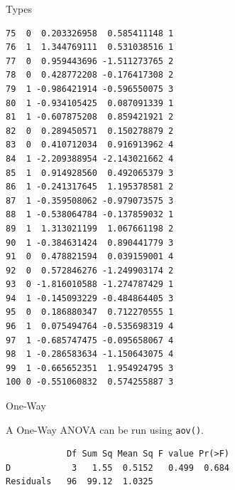 \begin{frame}[fragile]{Types}
\begin{verbatim}
75  0  0.203326958  0.585411148 1
76  1  1.344769111  0.531038516 1
77  0  0.959443696 -1.511273765 2
78  0  0.428772208 -0.176417308 2
79  1 -0.986421914 -0.596550075 3
80  1 -0.934105425  0.087091339 1
81  1 -0.607875208  0.859421921 2
82  0  0.289450571  0.150278879 2
83  0  0.410712034  0.916913962 4
84  1 -2.209388954 -2.143021662 4
85  1  0.914928560  0.492065379 3
86  1 -0.241317645  1.195378581 2
87  1 -0.359508062 -0.979073575 3
88  1 -0.538064784 -0.137859032 1
89  1  1.313021199  1.067661198 2
90  1 -0.384631424  0.890441779 3
91  0  0.478821594  0.039159001 4
92  0  0.572846276 -1.249903174 2
93  0 -1.816010588 -1.274787429 1
94  1 -0.145093229 -0.484864405 3
95  0  0.186880347  0.712270555 1
96  1  0.075494764 -0.535698319 4
97  1 -0.685747475 -0.095658067 4
98  1 -0.286583634 -1.150643075 4
99  1 -0.665652351  1.954924795 3
100 0 -0.551060832  0.574255887 3
\end{verbatim}

\end{frame}

\begin{frame}[fragile]{One-Way}

A One-Way ANOVA can be run using \texttt{aov()}.

\begin{Shaded}
\begin{Highlighting}[]
\StringTok{ }\OperatorTok{~}\StringTok{ }
\end{Highlighting}
\end{Shaded}

\begin{verbatim}
            Df Sum Sq Mean Sq F value Pr(>F)
D            3   1.55  0.5152   0.499  0.684
Residuals   96  99.12  1.0325               
\end{verbatim}

\end{frame}

